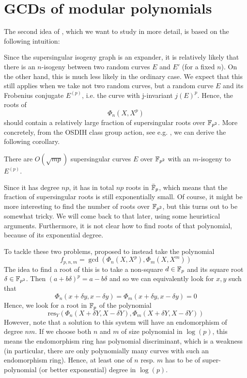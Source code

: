 \section{GCDs of modular polynomials}
The second idea of \cite{base_paper}, which we want to study in more detail, is based on the following intuition:

Since the supersingular isogeny graph is an expander, it is relatively likely that there is an $n$-isogeny between two random curves $E$ and $E'$ (for a fixed $n$).
On the other hand, this is much less likely in the ordinary case.
We expect that this still applies when we take not two random curves, but a random curve $E$ and its Frobenius conjugate $E^{(p)}$, i.e. the curve with j-invariant $j(E)^p$.
Hence, the roots of
\begin{equation*}
    \Phi_n(X, X^p)
\end{equation*}
should contain a relatively large fraction of supersingular roots over $\mathbb{F}_{p^2}$.
More concretely, from the OSDIH class group action, see e.g. \cite[Thm~4.3]{chenu_smith}, we can derive the following corollary.
\begin{corollary}
    \label{prop:osidh_class_group_action}
    There are $O(\sqrt{mp})$ supersingular curves $E$ over $\mathbb{F}_{p^2}$ with an $m$-isogeny to $E^{(p)}$.
\end{corollary}
Since it has degree $np$, it has in total $np$ roots in $\bar{\mathbb{F}}_p$, which means that the fraction of supersingular roots is still exponentially small.
Of course, it might be more interesting to find the number of roots over $\mathbb{F}_{p^2}$, but this turns out to be somewhat tricky.
We will come back to that later, using some heuristical arguments.
Furthermore, it is not clear how to find roots of that polynomial, because of its exponential degree.

To tackle these two problems, \cite{base_paper} proposed to instead take the polynomial
\begin{equation*}
    f_{p, n, m} = \gcd(\Phi_n(X, X^p), \Phi_m(X, X^m))
\end{equation*}
The idea to find a root of this is to take a non-square $d \in \mathbb{F}_p$ and its square root $\delta \in \mathbb{F}_{p^2}$.
Then $(a + b\delta)^p = a - b\delta$ and so we can equivalently look for $x, y$ such that
\begin{equation*}
    \Phi_n(x + \delta y, x - \delta y) = \Phi_m(x + \delta y, x - \delta y) = 0
\end{equation*}
Hence, we look for a root in $\mathbb{F}_p$ of the polynomial
\begin{equation*}
    \mathrm{res}_Y(\Phi_n(X + \delta Y, X - \delta Y), \Phi_m(X + \delta Y, X - \delta Y))
\end{equation*}
However, note that a solution to this system will have an endomorphism of degree $nm$.
If we choose both $n$ and $m$ of size polynomial in $\log(p)$, this means the endomorphism ring has polynomial discriminant, which is a weakness (in particular, there are only polynomially many curves with such an endomorphism ring).
Hence, at least one of $n$ resp. $m$ has to be of super-polynomial (or better exponential) degree in $\log(p)$.

